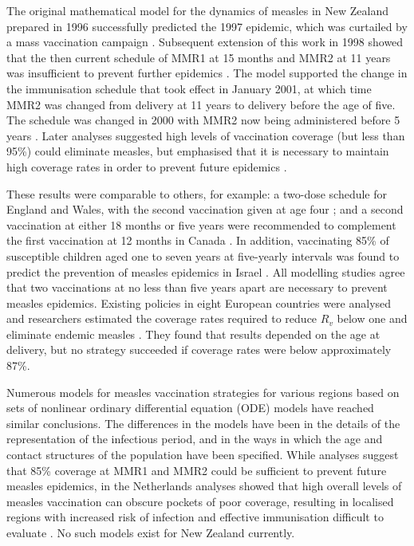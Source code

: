 \documentclass{article}
\begin{document}
The original mathematical model for the dynamics of measles in New Zealand prepared in 1996 \citep{tobias98} successfully predicted the 1997 epidemic, which was curtailed by a mass vaccination campaign \citep{mansoor98,roberts0}. Subsequent extension of this work in 1998 showed that the then current schedule of MMR1 at 15 months and MMR2 at 11 years was insufficient to prevent further epidemics \citep{roberts0}. The model supported the change in the immunisation schedule that took effect in January 2001, at which time MMR2 was changed from delivery at 11 years to delivery before the age of five. The schedule was changed in 2000 with MMR2 now being administered before 5 years \citep{anon2a}. Later analyses suggested high levels of vaccination coverage (but less than 95\%) could eliminate measles, but emphasised that it is necessary to maintain high coverage rates in order to prevent future epidemics \citep{roberts4}.

These results were comparable to others, for example: a two-dose schedule for England and Wales, with the second vaccination given at age four \citep{babad95}; and a second vaccination at either 18 months or five years were recommended to complement the first vaccination at 12 months in Canada \citep{gay98}. In addition, vaccinating 85\% of susceptible children aged one to seven years at five-yearly intervals was found to predict the prevention of measles epidemics in Israel \citep{agur93}. All modelling studies agree that two vaccinations at no less than five years apart are necessary to prevent measles epidemics. Existing policies in eight European countries were analysed and researchers estimated the coverage rates required to reduce $R_v$ below one and eliminate endemic measles \citep{wallinga1}. They found that results depended on the age at delivery, but no strategy succeeded if coverage rates were below approximately 87\%.

Numerous models for measles vaccination strategies for various regions \citep{agur93, babad95, edmunds0, gay98, wallinga1} based on sets of nonlinear ordinary differential equation (ODE) models have reached similar conclusions. The differences in the models have been in the details of the representation of the infectious period, and in the ways in which the age and contact structures of the population have been specified. While analyses suggest that 85\% coverage at MMR1 and MMR2 could be sufficient to prevent future measles epidemics, in the Netherlands analyses showed that high overall levels of measles vaccination can obscure pockets of poor coverage, resulting in localised regions with increased risk of infection and effective immunisation difficult to evaluate \citep{glass4}. No such models exist for New Zealand currently.
\end{document}
